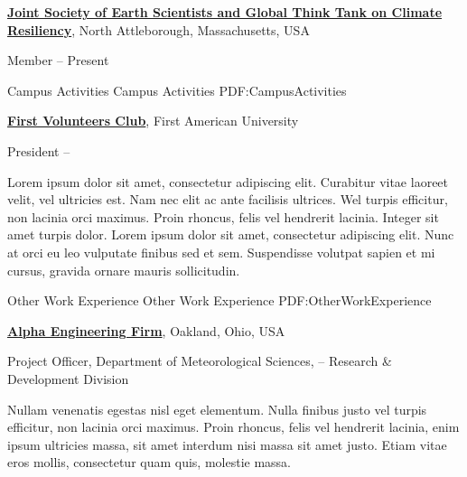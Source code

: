 \documentclass[letterpaper,MMMyyyy,nonstopmode]{simpleresumecv}
\begin{document}
\begin{Body}
\Entry
\href{http://www.example.com/my-society}
{\textbf{Joint Society of Earth Scientists and Global Think Tank on Climate Resiliency}},
\newline
North Attleborough, Massachusetts, USA

\Gap
\BulletItem
Member
\hfill
{} --
Present

\newpage


\Section
{Campus Activities}
{Campus Activities}
{PDF:CampusActivities}

\Entry
\href{http://www.example.com/my-club}
{\textbf{First Volunteers Club}},
First American University

\Gap
\BulletItem
President
\hfill
{} --
\begin{Detail}
\SubBulletItem
Lorem ipsum dolor sit amet, consectetur adipiscing elit.
\SubBulletItem
Curabitur vitae laoreet velit, vel ultricies est. Nam nec elit ac ante facilisis ultrices.
\SubSubBulletItem
Wel turpis efficitur, non lacinia orci maximus.
\SubSubBulletItem
Proin rhoncus, felis vel hendrerit lacinia.
\SubBulletItem
Integer sit amet turpis dolor. Lorem ipsum dolor sit amet, consectetur adipiscing elit. Nunc at orci eu leo vulputate finibus sed et sem.
\SubBulletItem
Suspendisse volutpat sapien et mi cursus, gravida ornare mauris sollicitudin.
\end{Detail}


\Section
{Other Work\newline
Experience}
{Other Work Experience}
{PDF:OtherWorkExperience}

\Entry
\href{http://www.example.com/my-company}
{\textbf{Alpha Engineering Firm}},
Oakland, Ohio, USA

\Gap
\BulletItem
Project Officer,
Department of Meteorological Sciences,
\hfill
{} --
\newline
Research \& Development Division
\begin{Detail}
\SubBulletItem
Nullam venenatis egestas nisl eget elementum.
\SubBulletItem
Nulla finibus justo vel turpis efficitur, non lacinia orci maximus. Proin rhoncus, felis vel hendrerit lacinia, enim ipsum ultricies massa, sit amet interdum nisi massa sit amet justo.
\SubBulletItem
Etiam vitae eros mollis, consectetur quam quis, molestie massa.
\end{Detail}


\end{Body}
\end{document}
